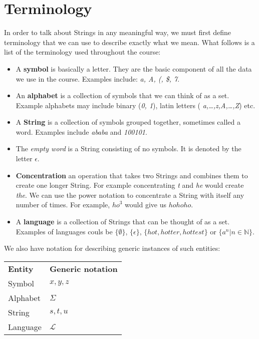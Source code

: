 
\section{Terminology}

In order to talk about Strings in any meaningful way, we must first define
terminology that we can use to describe exactly what we mean. What follows is a
list of the terminology used throughout the course:

\begin{itemize}
	\item A {\bf symbol} is basically a letter. They are the basic component of
	all the data we use in the course. Examples include: {\it a, A, (, \$, 7}.
	\item An {\bf alphabet} is a collection of symbols that we can think of as a
	set. Example alphabets may include binary ({\it 0, 1}), latin letters ({\it
	a,\dots,z,A,\dots,Z}) etc.
	\item A {\bf String} is a collection of symbols grouped together, sometimes
	called a word. Examples include {\it ababa} and {\it 100101}.
	\item The {\it empty word} is a String consisting of no symbols. It is
	denoted by the letter $\epsilon$.
	\item {\bf Concentration} an operation that takes two Strings and combines
	them to create one longer String. For example concentrating {\it t} and {\it
	he} would create {\it the}. We can use the power notation to concentrate a
	String with itself any number of times. For example, ${ho}^3$ would give us
	$hohoho$.
	\item A {\bf language} is a collection of Strings that can be thought of as
	a set. Examples of languages couls be $\{\emptyset\}$, $\{\epsilon\}$,
	$\{hot,hotter,hottest\}$ or $\{a^n | n \in \mathbb{N}\}$.
\end{itemize}

We also have notation for describing generic instances of such entities:

\begin{center}
	\begin{tabular}{l l}
		{\bf Entity} & {\bf Generic notation}\\
		Symbol & $x, y, z$\\
		Alphabet & $\Sigma$\\
		String & $s, t, u$\\
		Language & $\mathcal{L}$\\
	\end{tabular}
\end{center}

